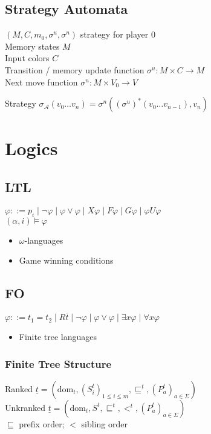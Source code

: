 \documentclass{article}
\begin{document}
\subsection{Strategy Automata}
$(M, C, m_0, \sigma^u, \sigma^n)$ strategy for player 0 \\
Memory states $M$ \\
Input colors $C$ \\
Transition / memory update function $\sigma^u : M \times C \rightarrow M$ \\
Next move function $\sigma^n : M \times V_0 \rightarrow V$

Strategy $\sigma_\mathcal{A}(v_0 \dots v_n) = \sigma^n((\sigma^u)^*(v_0 \dots v_{n-1}), v_n)$


\newpage
\section{Logics}
\subsection{LTL}
$\varphi ::= p_i \mid \neg \varphi \mid \varphi \lor \varphi \mid X \varphi \mid F \varphi \mid G \varphi \mid \varphi U \varphi$
\\
$(\alpha, i) \models \varphi$

\begin{itemize}
	\item $\omega$-languages
	\item Game winning conditions
\end{itemize}

\subsection{FO}
$\varphi ::= t_1 = t_2 \mid R\overline{t} \mid \neg \varphi \mid \varphi \lor \varphi \mid \exists x \varphi \mid \forall x \varphi$

\begin{itemize}
	\item Finite tree languages 
\end{itemize}

\subsubsection*{Finite Tree Structure}
Ranked $\underline{t} = (\text{dom}_t, (S_i^t)_{1 \leq i \leq m}, \sqsubseteq^t, (P_a^t)_{a \in \Sigma})$ \\
Unkranked $\underline{t} = (\text{dom}_t, S^t, \sqsubseteq^t, <^t, (P_a^t)_{a \in \Sigma})$ \\
$\sqsubseteq$ prefix order; $<$ sibling order
\end{document}
